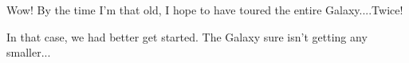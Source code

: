 \documentclass[main.tex]{subfiles}
\begin{document}
\par \Lacedaemon Wow!  By the time I'm that old, I hope to have toured the entire Galaxy....Twice!

\par \Celaeno In that case, we had better get started.  The Galaxy sure isn't getting any smaller...

%
%
%
%
%
%
%
%
%
%
%
%
%
%
%
%
%  
%
%
\end{document}
